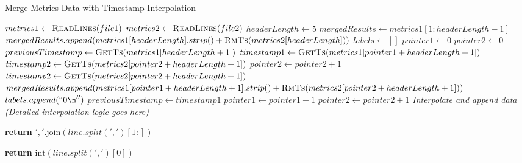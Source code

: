 \documentclass{article}
\begin{document}
\begin{algorithm}
\caption{Merge Metrics Data with Timestamp Interpolation}
\begin{algorithmic}[1]
    \State $metrics1 \gets \Call{ReadLines}{file1}$
    \State $metrics2 \gets \Call{ReadLines}{file2}$
    \State $headerLength \gets 5$
    \State $mergedResults \gets metrics1[1:headerLength-1]$
    \State $mergedResults.append(metrics1[headerLength].strip() + \Call{RmTs}{metrics2[headerLength]})$
    \State $labels \gets []$
    \State $pointer1 \gets 0$
    \State $pointer2 \gets 0$
    \State $previousTimestamp \gets \Call{GetTs}{metrics1[headerLength+1]}$
        \State $timestamp1 \gets \Call{GetTs}{metrics1[pointer1 + headerLength + 1]}$
        \State $timestamp2 \gets \Call{GetTs}{metrics2[pointer2 + headerLength + 1]}$
            \State $pointer2 \gets pointer2 + 1$
            \State $timestamp2 \gets \Call{GetTs}{metrics2[pointer2 + headerLength + 1]}$
        \EndWhile
            \State $mergedResults.append(metrics1[pointer1 + headerLength + 1].strip() + \Call{RmTs}{metrics2[pointer2 + headerLength + 1]})$
            \State $labels.append(``0\n'')$
            \State $previousTimestamp \gets timestamp1$
            \State $pointer1 \gets pointer1 + 1$
            \State $pointer2 \gets pointer2 + 1$
        \Else
            \State \textit{Interpolate and append data (Detailed interpolation logic goes here)}
        \EndIf
    \EndWhile
    \State {}
    \State {}
\EndProcedure

    \State \textbf{return} $','\text{.join}(line.split(',')[1:])$
\EndFunction

    \State \textbf{return} $\text{int}(line.split(',')[0])$
\EndFunction

\end{algorithmic}
\end{algorithm}
\end{document}
